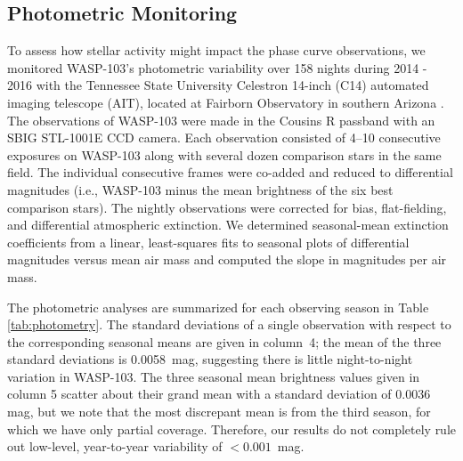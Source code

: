 \documentclass[twocolumn, trackchanges]{aastex61}
\begin{document}

\subsection{Photometric Monitoring}
To assess how stellar activity might impact the phase curve observations, we monitored WASP-103's photometric variability over 158 nights during 2014 - 2016 with the Tennessee State University Celestron 14-inch (C14) automated imaging telescope (AIT), located at Fairborn Observatory in southern Arizona \citep[][]{henry99}.  The observations of WASP-103 were made in the Cousins R passband with an SBIG STL-1001E CCD camera.  Each observation consisted of 4--10 consecutive exposures on WASP-103 along with several dozen comparison stars in the same field. The individual consecutive frames were co-added and reduced to differential magnitudes (i.e., WASP-103 minus the mean brightness of the six best comparison stars). The nightly observations were corrected for bias, flat-fielding, and differential atmospheric extinction.  We determined seasonal-mean extinction coefficients from a linear, least-squares fits to seasonal plots of differential magnitudes versus mean air mass and computed the slope in magnitudes per air mass.

The photometric analyses are summarized for each observing season in Table\,\ref{tab:photometry}.  The standard deviations of a single observation with respect to the corresponding seasonal means are given in column~4; the mean of the three standard deviations is 0.0058~mag, suggesting there is little night-to-night variation in WASP-103.  The three seasonal mean brightness values given in column 5 scatter about their grand mean with a standard deviation of 0.0036 mag, but we note that the most discrepant mean is from the third season, for which we have only partial coverage. Therefore, our results do not completely rule out low-level, year-to-year variability of $<0.001$~mag.
\end{document}

